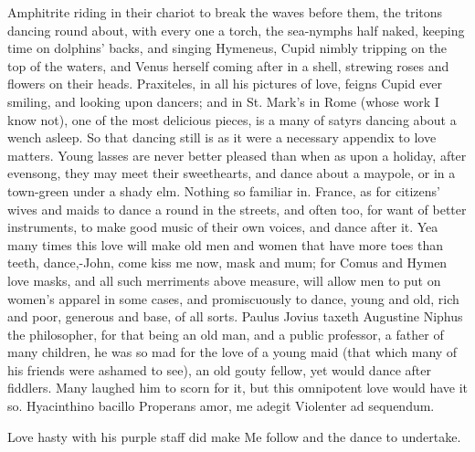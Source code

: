 {Amphitrite riding in their chariot to break the waves before them, the
tritons dancing round about, with every one a torch, the sea-nymphs
half naked, keeping time on dolphins' backs, and singing Hymeneus,
Cupid nimbly tripping on the top of the waters, and Venus herself
coming after in a shell, strewing roses and flowers on their heads.
Praxiteles, in all his pictures of love, feigns Cupid ever smiling, and
looking upon dancers; and in St. Mark's in Rome (whose work I know
not), one of the most delicious pieces, is a many of satyrs
dancing about a wench asleep. So that dancing still is as it were a
necessary appendix to love matters. Young lasses are never better
pleased than when as upon a holiday, after evensong, they may meet
their sweethearts, and dance about a maypole, or in a town-green under
a shady elm. Nothing so familiar in. France, as for citizens'
wives and maids to dance a round in the streets, and often too, for
want of better instruments, to make good music of their own voices, and
dance after it. Yea many times this love will make old men and women
that have more toes than teeth, dance,-John, come kiss me now, mask and
mum; for Comus and Hymen love masks, and all such merriments above
measure, will allow men to put on women's apparel in some cases, and
promiscuously to dance, young and old, rich and poor, generous and
base, of all sorts. Paulus Jovius taxeth Augustine Niphus the
philosopher, for that being an old man, and a public professor, a
father of many children, he was so mad for the love of a young maid
(that which many of his friends were ashamed to see), an old gouty
fellow, yet would dance after fiddlers. Many laughed him to scorn for
it, but this omnipotent love would have it so.
Hyacinthino bacillo
Properans amor, me adegit
Violenter ad sequendum.

Love hasty with his purple staff did make
Me follow and the dance to undertake.

}
